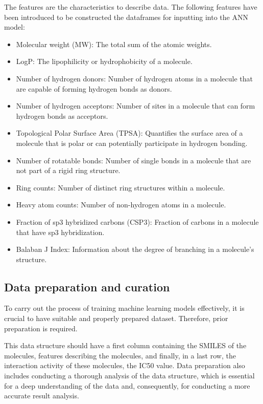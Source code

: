 \documentclass[final,times,twocolumn,article]{elsarticle}
\begin{document}
The features are the characteristics to describe data. The following features have been introduced to be constructed the dataframes for inputting into the ANN model:
\begin{itemize}
    \item Molecular weight (MW): The total sum of the atomic weights. 
    \item LogP: The lipophilicity or hydrophobicity of a molecule.
    \item Number of hydrogen donors: Number of hydrogen atoms in a molecule that are capable of forming hydrogen bonds as donors.
    \item Number of hydrogen acceptors: Number of sites in a molecule that can form hydrogen bonds as acceptors.
    \item Topological Polar Surface Area (TPSA): Quantifies the surface area of a molecule that is polar or can potentially participate in hydrogen bonding.
    \item Number of rotatable bonds: Number of single bonds in a molecule that are not part of a rigid ring structure.
    \item Ring counts: Number of distinct ring structures within a molecule.
    \item Heavy atom counts: Number of non-hydrogen atoms in a molecule.
    \item Fraction of sp3 hybridized carbons (CSP3): Fraction of carbons in a molecule that have sp3 hybridization.
    \item Balaban J Index: Information about the degree of branching in a molecule's structure.
\end{itemize}
\subsection{Data preparation and curation}

To carry out the process of training machine learning models effectively, it is crucial to have suitable and properly prepared dataset. Therefore, prior preparation is required. 

This data structure should have a first column containing the SMILES of the molecules, features describing the molecules, and finally, in a last row, the interaction activity of these molecules, the IC50 value. Data preparation also includes conducting a thorough analysis of the data structure, which is essential for a deep understanding of the data and, consequently, for conducting a more accurate result analysis. 
\end{document}

